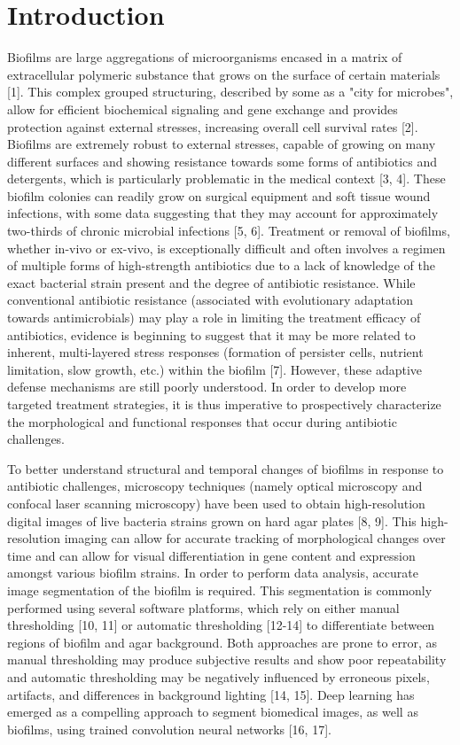\documentclass[conference]{IEEEtran}
\begin{document}
\section{Introduction}
\label{secName}
Biofilms are large aggregations of microorganisms encased in a matrix of extracellular polymeric substance that grows on the surface of certain materials [1]. This complex grouped structuring, described by some as a "city for microbes", allow for efficient biochemical signaling and gene exchange and provides protection against external stresses, increasing overall cell survival rates [2]. Biofilms are extremely robust to external stresses, capable of growing on many different surfaces and showing resistance towards some forms of antibiotics and detergents, which is particularly problematic in the medical context [3, 4]. These biofilm colonies can readily grow on surgical equipment and soft tissue wound infections, with some data suggesting that they may account for approximately two-thirds of chronic microbial infections [5, 6]. Treatment or removal of biofilms, whether in-vivo or ex-vivo, is exceptionally difficult and often involves a regimen of multiple forms of high-strength antibiotics due to a lack of knowledge of the exact bacterial strain present and the degree of antibiotic resistance. While conventional antibiotic resistance (associated with evolutionary adaptation towards antimicrobials) may play a role in limiting the treatment efficacy of antibiotics, evidence is beginning to suggest that it may be more related to inherent, multi-layered stress responses (formation of persister cells, nutrient limitation, slow growth, etc.) within the biofilm [7]. However, these adaptive defense mechanisms are still poorly understood. In order to develop more targeted treatment strategies, it is thus imperative to prospectively characterize the morphological and functional responses that occur during antibiotic challenges. 

To better understand structural and temporal changes of biofilms in response to antibiotic challenges, microscopy techniques (namely optical microscopy and confocal laser scanning microscopy) have been used to obtain high-resolution digital images of live bacteria strains grown on hard agar plates [8, 9]. This high-resolution imaging can allow for accurate tracking of morphological changes over time and can allow for visual differentiation in gene content and expression amongst various biofilm strains. In order to perform data analysis, accurate image segmentation of the biofilm is required. This segmentation is commonly performed using several software platforms, which rely on either manual thresholding [10, 11] or automatic thresholding [12-14] to differentiate between regions of biofilm and agar background. Both approaches are prone to error, as manual thresholding may produce subjective results and show poor repeatability and automatic thresholding may be negatively influenced by erroneous pixels, artifacts, and differences in background lighting [14, 15]. Deep learning has emerged as a compelling approach to segment biomedical images, as well as biofilms, using trained convolution neural networks [16, 17].
\end{document}
